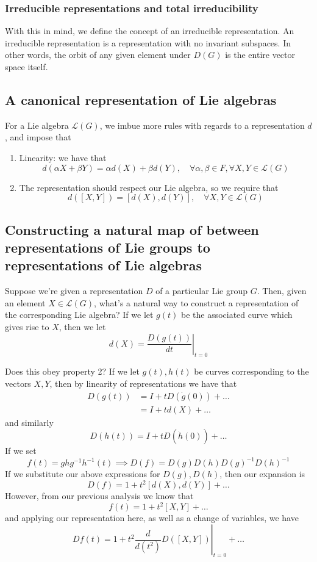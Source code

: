 \documentclass[11pt, oneside]{article}   	%
\theoremstyle{slanted}
\begin{document}
\subsubsection{Irreducible representations and total irreducibility } 
With this in mind, we define the concept of an irreducible representation. An irreducible representation is a representation with no invariant subspaces. In other words, the orbit of any given element under $D(G) $ is the entire vector space itself. 
\subsection{A canonical representation of Lie algebras}    

For a Lie algebra $\mathcal{L}(G)$, we imbue more rules with regards to a representation $d$, and impose that 
\begin{enumerate}
\item Linearity: we have that 
\[
d(\alpha X + \beta Y) = \alpha d(X) + \beta d(Y), \quad \forall \alpha, \beta \in F, \forall X, Y \in \mathcal{L}(G) \] 
\item The representation should respect our Lie algebra, so we require that 
\[ 
d([X, Y]) = [d(X), d(Y)], \quad \forall X, Y \in \mathcal{L}(G)
\]	 
\end{enumerate}
\subsection{Constructing a natural map of between representations of Lie groups to representations of Lie algebras}

Suppose we're given a representation $D$ of a particular Lie group $G$. Then, given an element $X \in \mathcal{L}(G) $, what's a natural way to construct a representation of the corresponding Lie algebra? If we let $g(t)$ be the associated curve which gives rise to $X$, then we let\[ d(X) = \left. \frac{D(g(t))}{dt}\right\vert_{t = 0} \]

Does this obey property 2? If we let $g(t), h(t)$ be curves corresponding to the vectors $X, Y$, then by linearity of representations we have that 
\begin{align*}
D(g(t)) &= I + t D(\dot{g}(0)) + \dots \\ &= I + t d(X) + \dots  
\end{align*}
and similarly \[ D(h(t)) = I + t D(\dot{h}(0)) + \dots \]
If we set 
\[
f(t) = ghg^{-1}h^{-1}(t) \implies D(f) = D(g)D(h)D(g)^{-1}D(h)^{-1} 
\]
If we substitute our above expressions for $D(g), D(h)$, then our expansion is 
\[
D(f) = 1 + t^2 [d(X), d(Y)] + \dots 
\]
However, from our previous analysis we know that 
\[ f(t) = 1 + t^2 [X, Y] + \dots \] 
and applying our representation here, as well as a change of variables, we have \[ Df(t) = 1 + t^2 \left. \frac{d}{d(t^2)} D([X, Y]) \right\vert_{t = 0} + \dots \]
\end{document}
